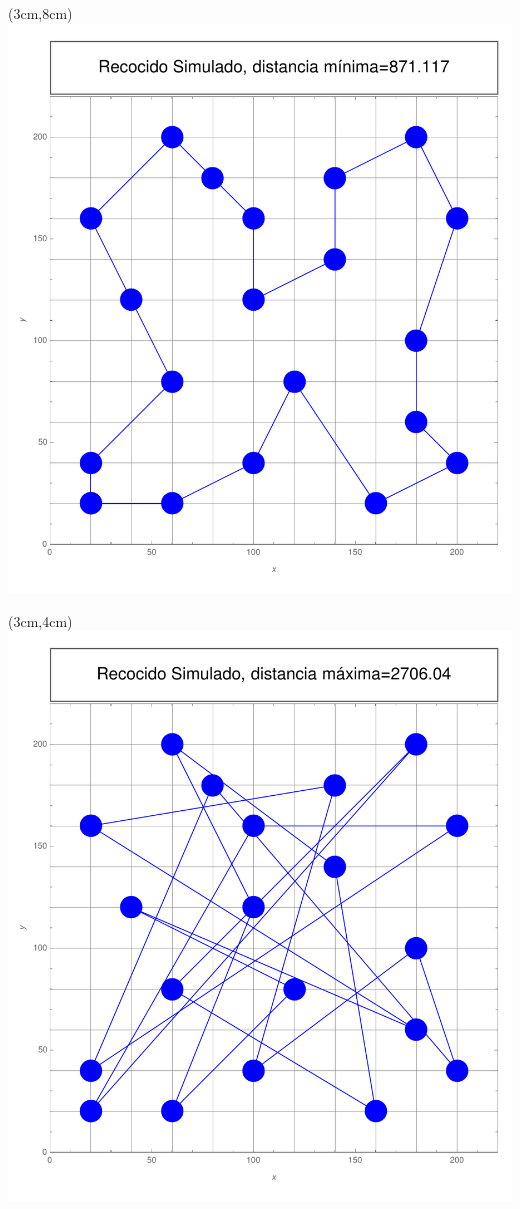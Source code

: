 \documentclass[11pt, table]{report}
\begin{document}
{\begin{textblock*}{\textwidth}(3cm,8cm)
\includegraphics[scale=0.65]{Recocido_simulado,dmin.pdf}
\end{textblock*}

\pagebreak

\begin{textblock*}{\textwidth}(3cm,4cm)
\includegraphics[scale=0.65]{Recocido_simulado,dmax.pdf}
\end{textblock*}

}
\end{document}
